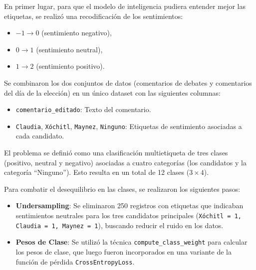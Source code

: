 \documentclass[10pt, a4paper]{article}
\begin{document}
	En primer lugar, para que el modelo de inteligencia pudiera entender mejor las etiquetas, se realizó una recodificación de los sentimientos:
	\begin{itemize}
		\item \(-1 \rightarrow 0\) (sentimiento negativo),
		\item \(0 \rightarrow 1\) (sentimiento neutral),
		\item \(1 \rightarrow 2\) (sentimiento positivo).
	\end{itemize}

	
	Se combinaron los dos conjuntos de datos (comentarios de debates y comentarios del día de la elección) en un único dataset con las siguientes columnas:
	\begin{itemize}
		\item \texttt{comentario\_editado}: Texto del comentario.
		\item \texttt{Claudia}, \texttt{Xóchitl}, \texttt{Maynez}, \texttt{Ninguno}: Etiquetas de sentimiento asociadas a cada candidato.
	\end{itemize}
	
	El problema se definió como una clasificación multietiqueta de tres clases (positivo, neutral y negativo) asociadas a cuatro categorías (los candidatos y la categoría ``Ninguno''). Esto resulta en un total de 12 clases (\(3 \times 4\)).
	
	Para combatir el desequilibrio en las clases, se realizaron los siguientes pasos:
	\begin{itemize}
		\item \textbf{Undersampling}: Se eliminaron 250 registros con etiquetas que indicaban sentimientos neutrales para los tres candidatos principales (\texttt{Xóchitl = 1, Claudia = 1, Maynez = 1}), buscando reducir el ruido en los datos.
		\item \textbf{Pesos de Clase}: Se utilizó la técnica \texttt{compute\_class\_weight} para calcular los pesos de clase, que luego fueron incorporados en una variante de la función de pérdida \texttt{CrossEntropyLoss}.
	\end{itemize}
	
\end{document}
